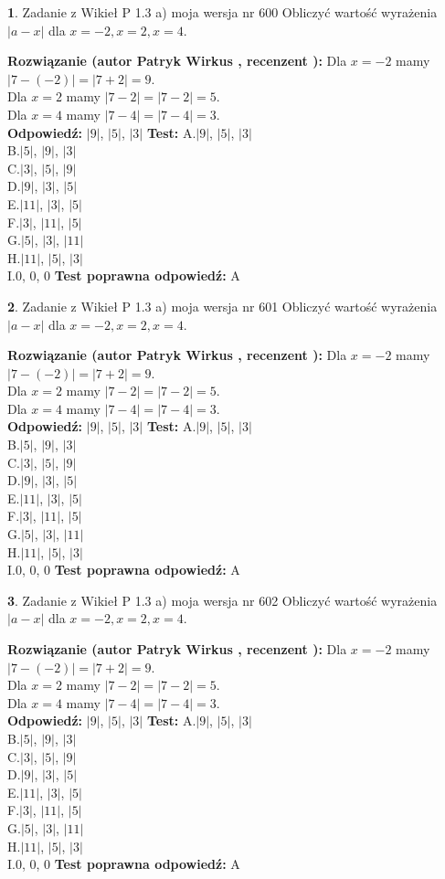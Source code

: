 \documentclass[12pt, a4paper]{article}
\theoremstyle{definition} %
\newtheorem{zad}{}
\newcommand{\zadStart}[1]{\begin{zad}#1\newline}
\newcommand{\zadStop}{\end{zad}}
\newcommand{\rozwStart}[2]{\noindent \textbf{Rozwiązanie (autor #1 , recenzent #2): }\newline}
\newcommand{\rozwStop}{\newline}
\newcommand{\odpStart}{\noindent \textbf{Odpowiedź:}\newline}
\newcommand{\odpStop}{\newline}
\newcommand{\testStart}{\noindent \textbf{Test:}\newline}
\newcommand{\testStop}{\newline}
\newcommand{\kluczStart}{\noindent \textbf{Test poprawna odpowiedź:}\newline}
\newcommand{\kluczStop}{\newline}
\begin{document}
\zadStart{Zadanie z Wikieł P 1.3 a) moja wersja nr 600}
Obliczyć wartość wyrażenia $|a - x|$ dla $x=-2,x=2,x=4$.
\zadStop
\rozwStart{Patryk Wirkus}{}
Dla $x = -2$ mamy $|7 - (-2)| = |7 + 2| = 9$.\\
Dla $x = 2$ mamy $|7 - 2| = |7 - 2| = 5$.\\
Dla $x = 4$ mamy $|7 - 4| = |7 - 4| = 3$.\\
\rozwStop
\odpStart
$|9|$, $|5|$, $|3|$
\odpStop
\testStart
A.$|9|$, $|5|$, $|3|$\\
B.$|5|$, $|9|$, $|3|$\\
C.$|3|$, $|5|$, $|9|$\\
D.$|9|$, $|3|$, $|5|$\\
E.$|11|$, $|3|$, $|5|$\\
F.$|3|$, $|11|$, $|5|$\\
G.$|5|$, $|3|$, $|11|$\\
H.$|11|$, $|5|$, $|3|$\\
I.$0$, $0$, $0$
\testStop
\kluczStart
A
\kluczStop



\zadStart{Zadanie z Wikieł P 1.3 a) moja wersja nr 601}
Obliczyć wartość wyrażenia $|a - x|$ dla $x=-2,x=2,x=4$.
\zadStop
\rozwStart{Patryk Wirkus}{}
Dla $x = -2$ mamy $|7 - (-2)| = |7 + 2| = 9$.\\
Dla $x = 2$ mamy $|7 - 2| = |7 - 2| = 5$.\\
Dla $x = 4$ mamy $|7 - 4| = |7 - 4| = 3$.\\
\rozwStop
\odpStart
$|9|$, $|5|$, $|3|$
\odpStop
\testStart
A.$|9|$, $|5|$, $|3|$\\
B.$|5|$, $|9|$, $|3|$\\
C.$|3|$, $|5|$, $|9|$\\
D.$|9|$, $|3|$, $|5|$\\
E.$|11|$, $|3|$, $|5|$\\
F.$|3|$, $|11|$, $|5|$\\
G.$|5|$, $|3|$, $|11|$\\
H.$|11|$, $|5|$, $|3|$\\
I.$0$, $0$, $0$
\testStop
\kluczStart
A
\kluczStop



\zadStart{Zadanie z Wikieł P 1.3 a) moja wersja nr 602}
Obliczyć wartość wyrażenia $|a - x|$ dla $x=-2,x=2,x=4$.
\zadStop
\rozwStart{Patryk Wirkus}{}
Dla $x = -2$ mamy $|7 - (-2)| = |7 + 2| = 9$.\\
Dla $x = 2$ mamy $|7 - 2| = |7 - 2| = 5$.\\
Dla $x = 4$ mamy $|7 - 4| = |7 - 4| = 3$.\\
\rozwStop
\odpStart
$|9|$, $|5|$, $|3|$
\odpStop
\testStart
A.$|9|$, $|5|$, $|3|$\\
B.$|5|$, $|9|$, $|3|$\\
C.$|3|$, $|5|$, $|9|$\\
D.$|9|$, $|3|$, $|5|$\\
E.$|11|$, $|3|$, $|5|$\\
F.$|3|$, $|11|$, $|5|$\\
G.$|5|$, $|3|$, $|11|$\\
H.$|11|$, $|5|$, $|3|$\\
I.$0$, $0$, $0$
\testStop
\kluczStart
A
\kluczStop
\end{document}
